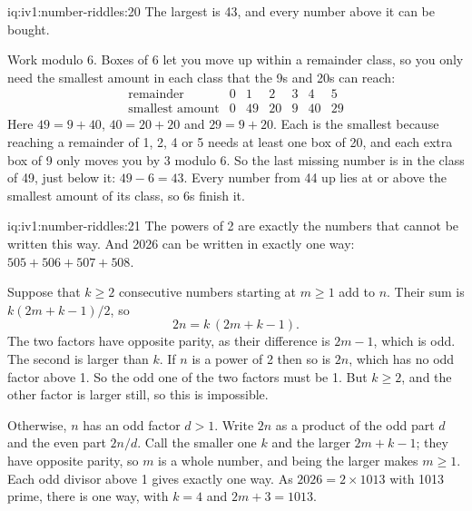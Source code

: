 \begin{solution}{iq:iv1:number-riddles:20}
The largest is 43, and every number above it can be bought.

Work modulo 6. Boxes of 6 let you move up within a remainder class, so you only need the smallest amount in each class that the 9s and 20s can reach:
\[
\begin{array}{c|cccccc}
\text{remainder} & 0 & 1 & 2 & 3 & 4 & 5 \\ \hline
\text{smallest amount} & 0 & 49 & 20 & 9 & 40 & 29
\end{array}
\]
Here $49 = 9 + 40$, $40 = 20 + 20$ and $29 = 9 + 20$. Each is the smallest because reaching a remainder of 1, 2, 4 or 5 needs at least one box of 20, and each extra box of 9 only moves you by 3 modulo 6. So the last missing number is in the class of 49, just below it: $49 - 6 = 43$. Every number from 44 up lies at or above the smallest amount of its class, so 6s finish it.

\end{solution}

\begin{solution}{iq:iv1:number-riddles:21}
The powers of 2 are exactly the numbers that cannot be written this way. And 2026 can be written in exactly one way: $505 + 506 + 507 + 508$.

Suppose that $k \geq 2$ consecutive numbers starting at $m \geq 1$ add to $n$. Their sum is $k(2m + k - 1)/2$, so
\[
2n = k \, (2m + k - 1).
\]
The two factors have opposite parity, as their difference is $2m - 1$, which is odd. The second is larger than $k$. If $n$ is a power of 2 then so is $2n$, which has no odd factor above 1. So the odd one of the two factors must be 1. But $k \geq 2$, and the other factor is larger still, so this is impossible.

Otherwise, $n$ has an odd factor $d > 1$. Write $2n$ as a product of the odd part $d$ and the even part $2n/d$. Call the smaller one $k$ and the larger $2m + k - 1$; they have opposite parity, so $m$ is a whole number, and being the larger makes $m \ge 1$. Each odd divisor above 1 gives exactly one way. As $2026 = 2 \times 1013$ with 1013 prime, there is one way, with $k = 4$ and $2m + 3 = 1013$.

\end{solution}

